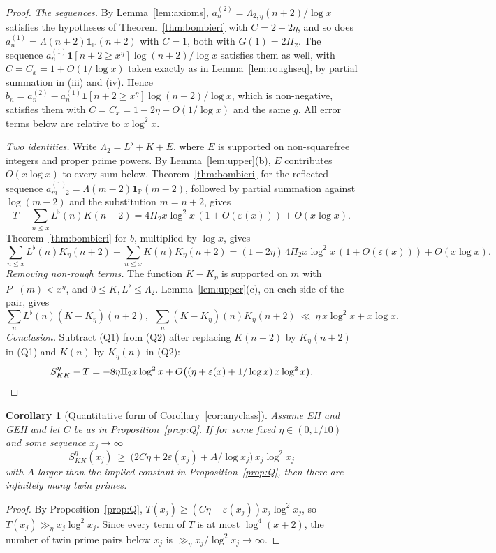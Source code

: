 \documentclass[11pt]{amsart}
\newtheorem{corollary}[theorem]{Corollary}
\theoremstyle{definition}
\theoremstyle{remark}
\newcommand{\PP}{\mathbb{P}}
\begin{document}
\begin{proof}
\emph{The sequences.} By Lemma~\ref{lem:axioms}, $a^{(2)}_n=\Lambda_{2,\eta}(n+2)/\log x$ satisfies the hypotheses of Theorem~\ref{thm:bombieri} with $C=2-2\eta$, and so does $a^{(1)}_n=\Lambda(n+2)\mathbf 1_{\PP}(n+2)$ with $C=1$, both with $G(1)=2\Pi_2$. The sequence $a^{(1)}_n\mathbf 1[n+2\ge x^\eta]\log(n+2)/\log x$ satisfies them as well, with $C=C_x=1+O(1/\log x)$ taken exactly as in Lemma~\ref{lem:roughseq}, by partial summation in (iii) and (iv). Hence $b_n=a^{(2)}_n-a^{(1)}_n\mathbf 1[n+2\ge x^\eta]\log(n+2)/\log x$, which is non-negative, satisfies them with $C=C_x=1-2\eta+O(1/\log x)$ and the same $g$. All error terms below are relative to $x\log^2x$.

\emph{Two identities.} Write $\Lambda_2=L^\flat+K+E$, where $E$ is supported on non-squarefree integers and proper prime powers. By Lemma~\ref{lem:upper}(b), $E$ contributes $O(x\log x)$ to every sum below. Theorem~\ref{thm:bombieri} for the reflected sequence $a^{(1)}_{m-2}=\Lambda(m-2)\mathbf 1_{\PP}(m-2)$, followed by partial summation against $\log(m-2)$ and the substitution $m=n+2$, gives
\[
T+\sum_{n\le x}L^\flat(n)K(n+2)=4\Pi_2x\log^2x\,(1+O(\varepsilon(x)))+O(x\log x).\tag{Q1}
\]
Theorem~\ref{thm:bombieri} for $b$, multiplied by $\log x$, gives
\[
\sum_{n\le x}L^\flat(n)K_\eta(n+2)+\sum_{n\le x}K(n)K_\eta(n+2)=(1-2\eta)\,4\Pi_2x\log^2x\,(1+O(\varepsilon(x)))+O(x\log x).\tag{Q2}
\]
\emph{Removing non-rough terms.} The function $K-K_\eta$ is supported on $m$ with $P^-(m)<x^\eta$, and $0\le K,L^\flat\le\Lambda_2$. Lemma~\ref{lem:upper}(c), on each side of the pair, gives
\[
\sum_nL^\flat(n)(K-K_\eta)(n+2),\ \ \sum_n(K-K_\eta)(n)K_\eta(n+2)\ \ll\ \eta\,x\log^2x+x\log x .
\]
\emph{Conclusion.} Subtract (Q1) from (Q2) after replacing $K(n+2)$ by $K_\eta(n+2)$ in (Q1) and $K(n)$ by $K_\eta(n)$ in (Q2):
\[
S^\eta_{KK}-T=-8\eta\Pi_2x\log^2x+O\bigl((\eta+\varepsilon(x)+1/\log x)\,x\log^2x\bigr).\qedhere
\]
\end{proof}

\begin{corollary}[Quantitative form of Corollary~\ref{cor:anyclass}]\label{cor:Q}
Assume EH and GEH and let $C$ be as in Proposition~\ref{prop:Q}. If for some fixed $\eta\in(0,1/10)$ and some sequence $x_j\to\infty$
\[
S^\eta_{KK}(x_j)\ \ge\ \bigl(2C\eta+2\varepsilon(x_j)+A/\log x_j\bigr)\,x_j\log^2x_j
\]
with $A$ larger than the implied constant in Proposition~\ref{prop:Q}, then there are infinitely many twin primes.
\end{corollary}
\begin{proof}
By Proposition~\ref{prop:Q}, $T(x_j)\ge(C\eta+\varepsilon(x_j))x_j\log^2x_j$, so $T(x_j)\gg_\eta x_j\log^2x_j$. Since every term of $T$ is at most $\log^4(x+2)$, the number of twin prime pairs below $x_j$ is $\gg_\eta x_j/\log^2x_j\to\infty$.
\end{proof}
\end{document}
